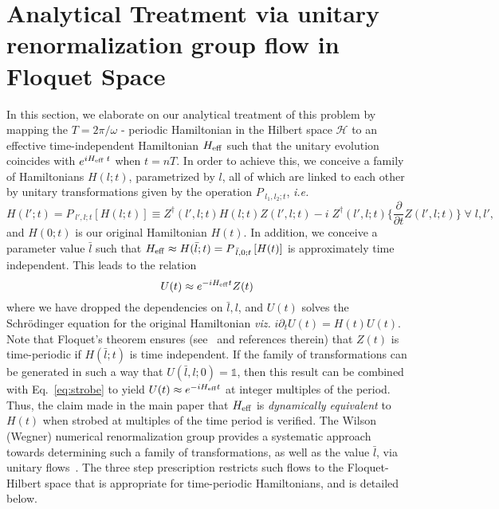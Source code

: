 \documentclass[aps,prl, notitlepage]{revtex4-1}
\begin{document}
\section{\sc Analytical Treatment via unitary renormalization group flow in Floquet Space}
In this section, we elaborate on our analytical treatment of this problem by mapping the $T=2\pi/\omega$ - periodic Hamiltonian in the Hilbert space $\mathcal{H}$ to an effective time-independent Hamiltonian $H_{\rm eff}$ such that the unitary evolution coincides with $e^{i H_{\rm eff}\;t}$ when $t=nT$. In order to achieve this, we conceive a family of Hamiltonians $H(l;t)$, parametrized by $l$, all of which are linked to each other by unitary transformations given by the operation $P_{\;l_1,l_2;t}$, \textit{i.e.}  
\begin{equation}
H(l';t) = P_{\;l',l;t}\left[H(l;t)\right] \equiv Z^\dagger(l',l;t) H(l;t) Z(l',l;t) - i\; Z^\dagger(l',l;t) \bigg\{ \frac{\partial}{\partial t}Z(l',l;t) \bigg\}\; \forall\; l,l' ,
\end{equation}
and $H(0;t)$ is our original Hamiltonian $H(t)$. In addition, we conceive a parameter value $\bar{l}$ such that 
$H_{\rm eff} \approx H(\bar{l};t)= P_{\;\bar{l},0;t}\left[H(t)\right]$ is approximately time independent. This leads to the relation
\begin{equation}
\label{eq:strobe}
U(t) \approx e^{-iH_{\rm eff}t}Z(t)
\end{equation}
where we have dropped the dependencies on $\bar{l},l$, and $U(t)$ solves the Schr\"odinger equation for the original Hamiltonian \textit{viz.} $i\partial_t U(t) = H(t) U(t)$. Note that Floquet's theorem ensures (see~\cite{Analabha1,Analabha2} and references therein) that $Z(t)$ is time-periodic if $H(\bar{l};t)$ is time independent. If the family of transformations can be generated in such a way that $U(\bar{l},l;0)=\mathds{1}$, then this result can be combined with Eq.~\ref{eq:strobe} to yield $U(t)\approx e^{-iH_{\rm eff}t}$ at integer multiples of the period. Thus, the claim made in the main paper that $H_{\rm eff}$ is \textit{dynamically equivalent} to $H(t)$ when strobed at multiples of the time period is verified. The Wilson (Wegner) numerical renormalization group provides a systematic approach towards determining such a family of transformations, as well as the value $\bar{l}$, via unitary flows~\cite{Kehrein-book}. The three step prescription restricts such flows to the Floquet-Hilbert space that is 
appropriate for time-periodic Hamiltonians, and is detailed below.
\end{document}

